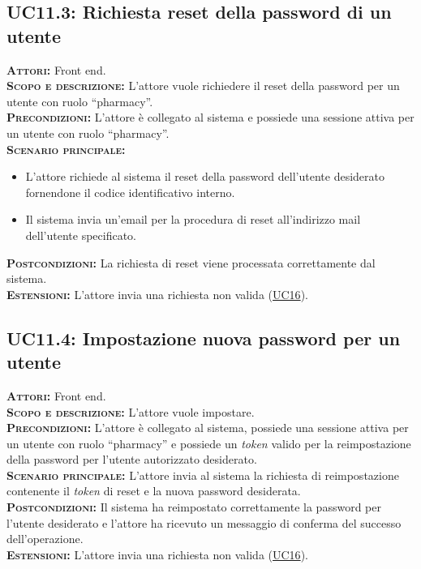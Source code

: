 \subsection{UC11.3: Richiesta reset della password di un utente}
\label{sec:UC113}
\textsc{\textbf{Attori:}} Front end.\\
\textsc{\textbf{Scopo e descrizione:}} L'attore vuole richiedere il reset della password per un utente con ruolo ``pharmacy''.\\
\textsc{\textsc{\textbf{Precondizioni:}}} L'attore è collegato al sistema e possiede una sessione attiva per un utente con ruolo ``pharmacy''.\\
\textsc{\textbf{Scenario principale:}} 
\begin{itemize}
    \item L'attore richiede al sistema il reset della password dell'utente desiderato fornendone il codice identificativo interno.
    \item Il sistema invia un'email per la procedura di reset all'indirizzo mail dell'utente specificato.
\end{itemize}
\textsc{\textbf{Postcondizioni:}} La richiesta di reset viene processata correttamente dal sistema.\\
\textsc{\textbf{Estensioni:}} L'attore invia una richiesta non valida (\hyperref[sec:UC16]{UC16}).

\subsection{UC11.4: Impostazione nuova password per un utente}
\label{sec:UC114}
\textsc{\textbf{Attori:}} Front end.\\
\textsc{\textbf{Scopo e descrizione:}} L'attore vuole impostare.\\
\textsc{\textsc{\textbf{Precondizioni:}}} L'attore è collegato al sistema, possiede una sessione attiva per un utente con ruolo ``pharmacy'' e possiede un \textit{token} valido per la reimpostazione della password per l'utente autorizzato desiderato.\\
\textsc{\textbf{Scenario principale:}} L'attore invia al sistema la richiesta di reimpostazione contenente il \textit{token} di reset e la nuova password desiderata.\\
\textsc{\textbf{Postcondizioni:}} Il sistema ha reimpostato correttamente la password per l'utente desiderato e l'attore ha ricevuto un messaggio di conferma del successo dell'operazione.\\
\textsc{\textbf{Estensioni:}} L'attore invia una richiesta non valida (\hyperref[sec:UC16]{UC16}).

